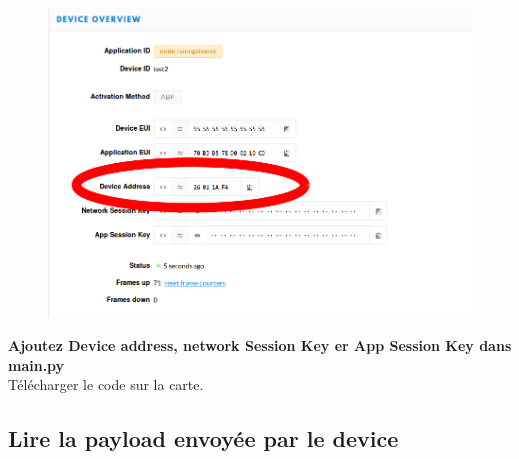 \documentclass{article}
\begin{document}
\begin{figure}[H]
\begin{center}
\advance\leftskip-3cm
\advance\rightskip-3cm
\includegraphics[keepaspectratio=true,scale=0.4]{overview_deviceaddressapb.png}
\label{visina8}
\end{center}\end{figure}

\textbf{Ajoutez Device address, network Session Key er App Session Key dans main.py}\\
Télécharger le code sur la carte.

    
    \subsection{Lire la payload envoyée par le device}
    
\end{document}
